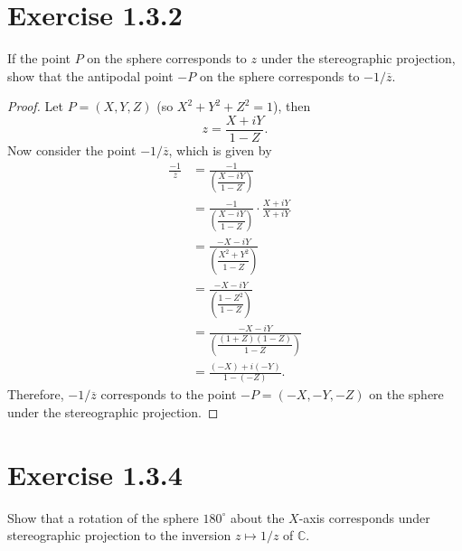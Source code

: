 \documentclass[12pt]{article}
\newenvironment{problem}
    {\begin{lrbox}{\mybox}\begin{minipage}{\textwidth-10pt}}
    {\end{minipage}\end{lrbox}\framebox[6.5in]{\usebox{\mybox}}}
\newcommand{\conj}[1]{\overline{#1}}
\newcommand{\C}{\mathbb{C}}
\begin{document}
\newpage
\section*{Exercise 1.3.2}
\begin{problem}
    If the point $P$ on the sphere corresponds to $z$ under the stereographic projection, show that the antipodal point $-P$ on the sphere corresponds to $-1/\conj{z}$.
\end{problem}

\begin{proof}
    Let $P = (X,Y,Z)$ (so $X^2+Y^2+Z^2 =1$), then
    \[z = \frac{X + iY}{1-Z}.\]
    Now consider the point $-1/\conj{z}$, which is given by
    \begin{align*}
        \frac{-1}{\conj{z}}
            &= \frac{-1}{\left(\dfrac{X-iY}{1-Z}\right)} \\
            &= \frac{-1}{\left(\dfrac{X-iY}{1-Z}\right)} \cdot \frac{X+iY}{X+iY}\\
            &= \frac{-X-iY}{\left(\dfrac{X^2+Y^2}{1-Z}\right)} \\
            &= \frac{-X-iY}{\left(\dfrac{1-Z^2}{1-Z}\right)} \\
            &= \frac{-X-iY}{\left(\dfrac{(1+Z)(1-Z)}{1-Z}\right)} \\
            &= \frac{(-X)+i(-Y)}{1-(-Z)}.
    \end{align*}
    Therefore, $-1/\conj{z}$ corresponds to the point $-P=(-X,-Y,-Z)$ on the sphere under the stereographic projection.
    
\end{proof}

\newpage
\section*{Exercise 1.3.4}
\begin{problem}
    Show that a rotation of the sphere $180^\circ$ about the $X$-axis corresponds under stereographic projection to the inversion $z\mapsto 1/z$ of $\C$.
\end{problem}
\end{document}
